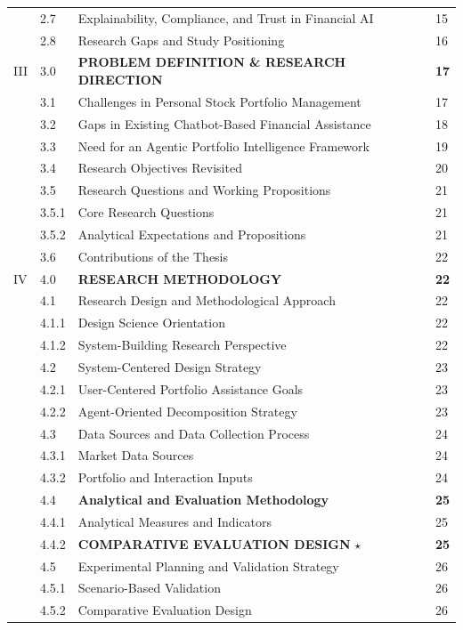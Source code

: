 \documentclass[11pt]{article}
\begin{document}
\begin{longtable}{C{0.8cm}C{1.2cm}L{9.7cm}C{1.2cm}}
 & 2.7 & Explainability, Compliance, and Trust in Financial AI & 15 \\
 & 2.8 & Research Gaps and Study Positioning & 16 \\
III & 3.0 & \textbf{PROBLEM DEFINITION \& RESEARCH DIRECTION} & \textbf{17} \\
 & 3.1 & Challenges in Personal Stock Portfolio Management & 17 \\
 & 3.2 & Gaps in Existing Chatbot-Based Financial Assistance & 18 \\
 & 3.3 & Need for an Agentic Portfolio Intelligence Framework & 19 \\
 & 3.4 & Research Objectives Revisited & 20 \\
 & 3.5 & Research Questions and Working Propositions & 21 \\
 & 3.5.1 & Core Research Questions & 21 \\
 & 3.5.2 & Analytical Expectations and Propositions & 21 \\
 & 3.6 & Contributions of the Thesis & 22 \\
IV & 4.0 & \textbf{RESEARCH METHODOLOGY} & \textbf{22} \\
 & 4.1 & Research Design and Methodological Approach & 22 \\
 & 4.1.1 & Design Science Orientation & 22 \\
 & 4.1.2 & System-Building Research Perspective & 22 \\
 & 4.2 & System-Centered Design Strategy & 23 \\
 & 4.2.1 & User-Centered Portfolio Assistance Goals & 23 \\
 & 4.2.2 & Agent-Oriented Decomposition Strategy & 23 \\
 & 4.3 & Data Sources and Data Collection Process & 24 \\
 & 4.3.1 & Market Data Sources & 24 \\
 & 4.3.2 & Portfolio and Interaction Inputs & 24 \\
 & 4.4 & \textbf{Analytical and Evaluation Methodology} & \textbf{25} \\
 & 4.4.1 & Analytical Measures and Indicators & 25 \\
 & 4.4.2 & \textbf{COMPARATIVE EVALUATION DESIGN} $\star$ & \textbf{25} \\
 & 4.5 & Experimental Planning and Validation Strategy & 26 \\
 & 4.5.1 & Scenario-Based Validation & 26 \\
 & 4.5.2 & Comparative Evaluation Design & 26 \\

\end{longtable}
\end{document}
